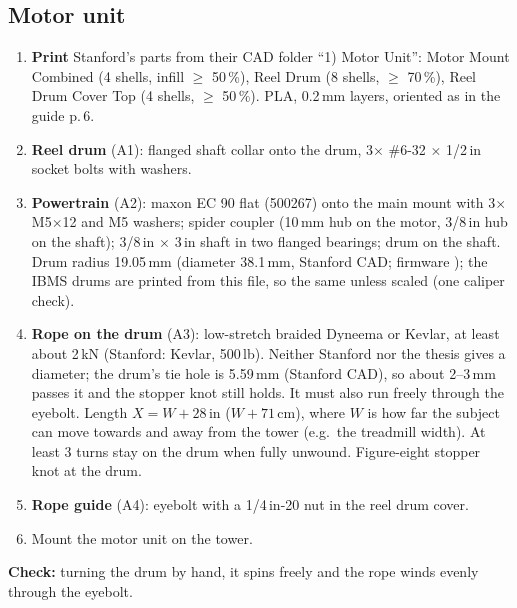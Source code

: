 \subsection{Motor unit}
\begin{enumerate}
\item \textbf{Print} Stanford's parts from their CAD folder ``1) Motor Unit'': Motor Mount Combined
(4 shells, infill $\geq$ 50\,\%), Reel Drum (8 shells, $\geq$ 70\,\%), Reel Drum Cover Top (4 shells,
$\geq$ 50\,\%). PLA, 0.2\,mm layers, oriented as in the guide p.\,6.
\item \textbf{Reel drum} (A1): flanged shaft collar onto the drum, 3$\times$ \#6-32 $\times$ 1/2\,in socket bolts
with washers.
\item \textbf{Powertrain} (A2): maxon EC 90 flat (500267) onto the main mount with 3$\times$ M5$\times$12 and
M5 washers; spider coupler (10\,mm hub on the motor, 3/8\,in hub on the shaft); 3/8\,in $\times$ 3\,in shaft
in two flanged bearings; drum on the shaft. Drum radius 19.05\,mm (diameter 38.1\,mm, Stanford CAD;
firmware ); the IBMS drums are printed from this file, so the same unless scaled (one caliper check).
\item \textbf{Rope on the drum} (A3): low-stretch braided Dyneema or Kevlar, at least about 2\,kN (Stanford:
Kevlar, 500\,lb). Neither Stanford nor the thesis gives a diameter; the drum's tie hole is 5.59\,mm (Stanford CAD), so
about 2--3\,mm passes it and the stopper knot still holds. It must also run freely through the eyebolt. 
Length $X = W + 28$\,in ($W + 71$\,cm), where $W$ is how far the
subject can move towards and away from the tower (e.g.\ the treadmill width). At least 3 turns stay on the
drum when fully unwound. Figure-eight stopper knot at the drum.
\item \textbf{Rope guide} (A4): eyebolt with a 1/4\,in-20 nut in the reel drum cover.
\item Mount the motor unit on the tower. 
\end{enumerate}
\textbf{Check:} turning the drum by hand, it spins freely and the rope winds evenly through the eyebolt.

